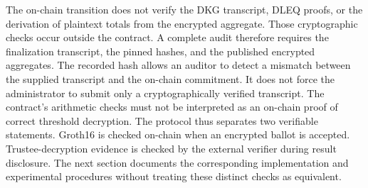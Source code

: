 The on-chain transition does not verify the DKG transcript, DLEQ proofs,
or the derivation of plaintext totals from the encrypted aggregate. Those
cryptographic checks occur outside the contract. A complete audit therefore
requires the finalization transcript, the pinned hashes, and the published
encrypted aggregates. The recorded hash allows an auditor to detect a
mismatch between the supplied transcript and the on-chain commitment.
It does not force the administrator to submit only a cryptographically
verified transcript. The contract's arithmetic checks must not be
interpreted as an on-chain proof of correct threshold decryption.
The protocol thus separates two verifiable statements. Groth16 is checked
on-chain when an encrypted ballot is accepted. Trustee-decryption evidence
is checked by the external verifier during result disclosure. The next
section documents the corresponding implementation and experimental
procedures without treating these distinct checks as equivalent.

